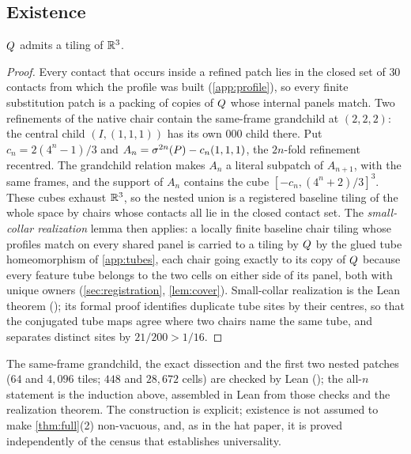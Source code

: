 \subsection{Existence}\label{sec:existence}

\begin{theorem}\label{thm:existence}
$Q$ admits a tiling of $\mathbb{R}^3$.
\end{theorem}

\begin{proof}
Every contact that occurs inside a refined patch lies in the closed set of $30$ contacts from
which the profile was built (\cref{app:profile}), so every finite substitution patch is a packing
of copies of $Q$ whose internal panels match. Two refinements of the native chair contain the
same-frame grandchild at $(2,2,2)$: the central child $(I,(1,1,1))$ has its own $000$ child there.
Put $c_n=2(4^n-1)/3$ and $A_n=\sigma^{2n}(P)-c_n(1,1,1)$, the $2n$-fold refinement
recentred. The grandchild relation makes $A_n$ a literal subpatch of $A_{n+1}$, with the same
frames, and the support of $A_n$ contains the cube $[-c_n,(4^n+2)/3]^3$. These cubes exhaust
$\mathbb{R}^3$, so the nested union is a registered baseline tiling of the whole space by chairs whose
contacts all lie in the closed contact set. The \emph{small-collar realization} lemma then
applies: a locally finite baseline chair tiling whose profiles match on every shared panel is
carried to a tiling by $Q$ by the glued tube homeomorphism of \cref{app:tubes}, each chair
going exactly to its copy of $Q$ because every feature tube belongs to the two cells on
either side of its panel, both with unique owners (\cref{sec:registration}, \cref{lem:cover}).
Small-collar realization is the Lean theorem 
(); its formal proof identifies duplicate tube sites by their centres, so that the
conjugated tube maps agree where two chairs name the same tube, and separates distinct sites by
$21/200>1/16$.
\end{proof}

The same-frame grandchild, the exact dissection and the first two nested patches ($64$ and
$4{,}096$ tiles; $448$ and $28{,}672$ cells) are checked by Lean (); the
all-$n$ statement is the induction above, assembled in Lean from those checks and the realization
theorem. The construction is explicit; existence is not assumed to make \cref{thm:full}(2)
non-vacuous, and, as in the hat paper, it is proved independently of the census that establishes
universality.
